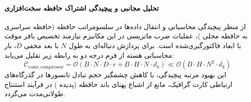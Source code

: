 \paragraph{تحلیل مجانبی و پیچیدگی اشتراک حافظه سخت‌افزاری}
از منظر پیچیدگی محاسباتی و انتقال داده‌ها در سلسومراتب حافظه (حافظه سراسری  به حافظه محلی )، عملیات ضرب ماتریسی در این مکانیزم نیازمند تخصیص بافر موقت با ابعاد فاکتورگیری‌شده است. برای پردازش دنباله‌ای به طول $N$ با بعد مخفی $D$، بار محاسباتی هسته از فرم درجه دو به رابطه زیر تقلیل می‌یابد:
\begin{equation}
\label{eq:complexity_come_compressor}
\mathcal{C}_{\text{come\_compressor}} = \mathcal{O}\left( B \cdot N \cdot D \cdot r + B \cdot H \cdot N \cdot d_k \right) \ll \mathcal{O}\left( B \cdot H \cdot N^2 \cdot d_k \right)
\end{equation}
این بهبود مرتبه پیچیدگی، با کاهش چشمگیر حجم تبادل تانسورها در گذرگاه‌های ارتباطی کارت گرافیک، مانع از اشباع پهنای باند حافظه (پدیده ) در فرآیند استنتاج طولانی‌مدت می‌گردد.
